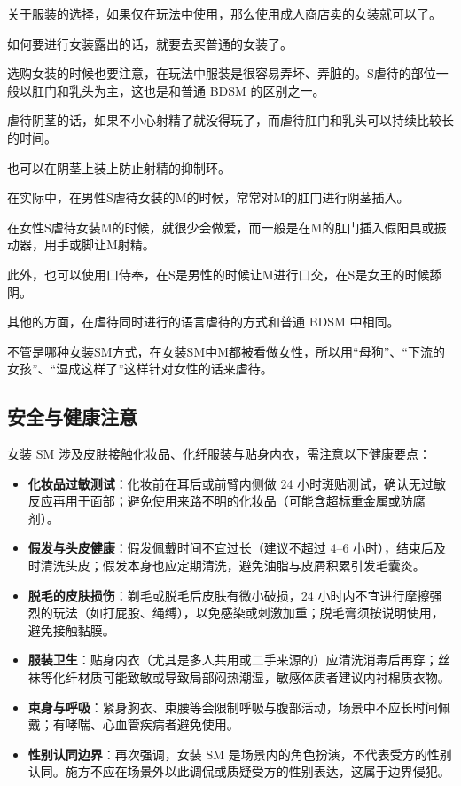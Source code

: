 \documentclass[12pt,UTF8]{ctexbook}
\begin{document}
关于服装的选择，如果仅在玩法中使用，那么使用成人商店卖的女装就可以了。

如何要进行女装露出的话，就要去买普通的女装了。

选购女装的时候也要注意，在玩法中服装是很容易弄坏、弄脏的。S虐待的部位一般以肛门和乳头为主，这也是和普通 BDSM 的区别之一。

虐待阴茎的话，如果不小心射精了就没得玩了，而虐待肛门和乳头可以持续比较长的时间。

也可以在阴茎上装上防止射精的抑制环。

在实际中，在男性S虐待女装的M的时候，常常对M的肛门进行阴茎插入。

在女性S虐待女装M的时候，就很少会做爱，而一般是在M的肛门插入假阳具或振动器，用手或脚让M射精。

此外，也可以使用口侍奉，在S是男性的时候让M进行口交，在S是女王的时候舔阴。

其他的方面，在虐待同时进行的语言虐待的方式和普通 BDSM 中相同。

不管是哪种女装SM方式，在女装SM中M都被看做女性，所以用“母狗”、“下流的女孩”、“湿成这样了”这样针对女性的话来虐待。

\subsection{安全与健康注意}

女装 SM 涉及皮肤接触化妆品、化纤服装与贴身内衣，需注意以下健康要点：

\begin{itemize}
\item \textbf{化妆品过敏测试}：化妆前在耳后或前臂内侧做 24 小时斑贴测试，确认无过敏反应再用于面部；避免使用来路不明的化妆品（可能含超标重金属或防腐剂）。
\item \textbf{假发与头皮健康}：假发佩戴时间不宜过长（建议不超过 4--6 小时），结束后及时清洗头皮；假发本身也应定期清洗，避免油脂与皮屑积累引发毛囊炎。
\item \textbf{脱毛的皮肤损伤}：剃毛或脱毛后皮肤有微小破损，24 小时内不宜进行摩擦强烈的玩法（如打屁股、绳缚），以免感染或刺激加重；脱毛膏须按说明使用，避免接触黏膜。
\item \textbf{服装卫生}：贴身内衣（尤其是多人共用或二手来源的）应清洗消毒后再穿；丝袜等化纤材质可能致敏或导致局部闷热潮湿，敏感体质者建议内衬棉质衣物。
\item \textbf{束身与呼吸}：紧身胸衣、束腰等会限制呼吸与腹部活动，场景中不应长时间佩戴；有哮喘、心血管疾病者避免使用。
\item \textbf{性别认同边界}：再次强调，女装 SM 是场景内的角色扮演，不代表受方的性别认同。施方不应在场景外以此调侃或质疑受方的性别表达，这属于边界侵犯。
\end{itemize}
\end{document}
